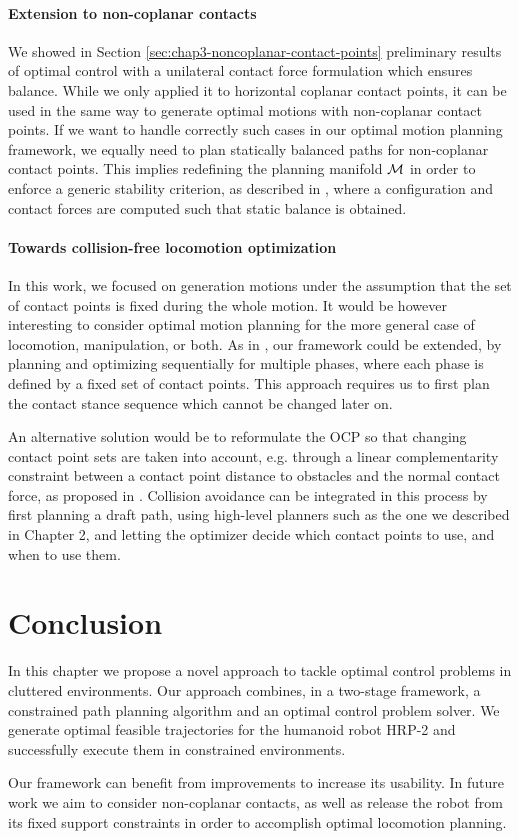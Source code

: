 \paragraph{Extension to non-coplanar contacts}
We showed in Section \ref{sec:chap3-noncoplanar-contact-points}
preliminary results of optimal control with a unilateral contact force
formulation which ensures balance. While we only applied it to
horizontal coplanar contact points, it can be used in the same way to
generate optimal motions with non-coplanar contact points. If we want
to handle correctly such cases in our optimal motion planning
framework, we equally need to plan statically balanced paths for
non-coplanar contact points. This implies redefining the planning
manifold $\mathcal{M}$ in order to enforce a generic stability criterion,
as described in \cite{bretl2006motion}, where a configuration and
contact forces are computed such that static balance is obtained.

\paragraph{Towards collision-free locomotion optimization}
In this work, we focused on generation motions under the assumption
that the set of contact points is fixed during the whole motion. It
would be however interesting to consider optimal motion planning for
the more general case of locomotion, manipulation, or both. As in
\cite{lengagne2011generation}, our framework could be extended, by
planning and optimizing sequentially for multiple phases, where each
phase is defined by a fixed set of contact points. This approach
requires us to first plan the contact stance sequence which cannot be
changed later on.

An alternative solution would be to reformulate the OCP so that
changing contact point sets are taken into account, e.g. through a
linear complementarity constraint between a contact point distance to
obstacles and the normal contact force, as proposed in
\cite{posa2012direct, tassa2012synthesis,
  mordatch2012discovery}. Collision avoidance can be integrated in
this process by first planning a draft path, using high-level planners
such as the one we described in Chapter 2, and letting the optimizer
decide which contact points to use, and when to use them.

\section{Conclusion}
In this chapter we propose a novel approach to tackle optimal control
problems in cluttered environments. Our approach combines, in a
two-stage framework, a constrained path planning algorithm and an
optimal control problem solver. We generate optimal feasible
trajectories for the humanoid robot HRP-2 and successfully execute
them in constrained environments.

Our framework can benefit from improvements to increase its
usability. In future work we aim to consider non-coplanar contacts, as
well as release the robot from its fixed support constraints in order
to accomplish optimal locomotion planning.
